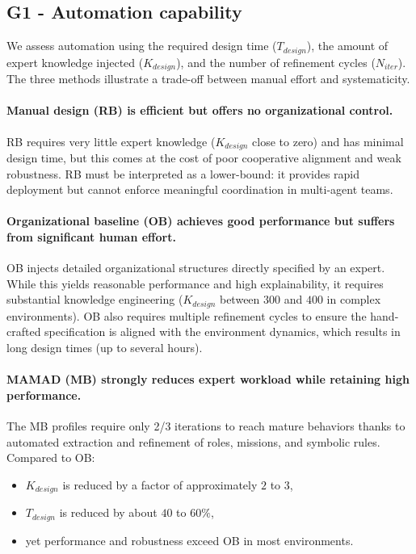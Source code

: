 \documentclass[pdflatex,sn-mathphys-num]{sn-jnl}%
\theoremstyle{thmstyleone}%
\theoremstyle{thmstyletwo}%
\theoremstyle{thmstylethree}%
\begin{document}
\subsection{G1 - Automation capability}

We assess automation using the required design time ($T_{design}$), the amount
of expert knowledge injected ($K_{design}$), and the number of refinement cycles
($N_{iter}$). The three methods illustrate a trade-off between manual effort and
systematicity.

\paragraph*{Manual design (RB) is efficient but offers no organizational control.}
RB requires very little expert knowledge ($K_{design}$ close to zero) and has
minimal design time, but this comes at the cost of poor cooperative alignment
and weak robustness. RB must be interpreted as a lower-bound: it provides rapid
deployment but cannot enforce meaningful coordination in multi-agent teams.

\paragraph*{Organizational baseline (OB) achieves good performance but suffers from significant human effort.}
OB injects detailed organizational structures directly specified by an expert.
While this yields reasonable performance and high explainability, it requires
substantial knowledge engineering ($K_{design}$ between $300$ and $400$ in complex
environments). OB also requires multiple refinement cycles to ensure the
hand-crafted specification is aligned with the environment dynamics, which
results in long design times (up to several hours).

\paragraph*{MAMAD (MB) strongly reduces expert workload while retaining high performance.}
The MB profiles require only 2/3 iterations to reach mature behaviors thanks to
automated extraction and refinement of roles, missions, and symbolic rules.  
Compared to OB:

\begin{itemize}
    \item $K_{design}$ is reduced by a factor of approximately $2$ to $3$,
    \item $T_{design}$ is reduced by about $40$ to $60\%$,
    \item yet performance and robustness exceed OB in most environments.
\end{itemize}
\end{document}

